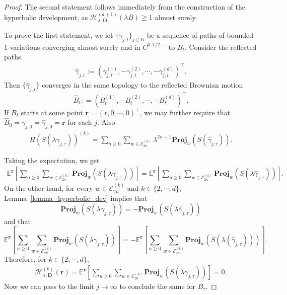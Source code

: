 \documentclass[11pt,a4paper,english,reqno]{amsart}
\theoremstyle{plain}
\newcommand{\1}{\mathbbm{1}}
\newcommand{\proj}{\mathbf{Proj}}
\begin{document}
\begin{proof}
The second statement follows immediately from the construction of the hyperbolic development, as $\mathcal{H}_{\lambda, \mathbf{D}}^{(d+1)}(\lambda B) \geq 1$ almost surely. 

To prove the first statement, we let $\{\gamma_{j,t}\}_{j \in \mathbb{N}}$ be a sequence of paths of bounded $1$-variations converging almost surely and in $C^{0,1/2-}$ to $B_t$. Consider the reflected paths
\begin{align*}
    \hat{\gamma}_{j,t} := \left(  \gamma^{(1)}_{j,t}, -\gamma^{(2)}_{j,t}, \cdots,-\gamma^{(d)}_{j,t} \right)^\top.
\end{align*}
Then $\{\hat{\gamma}_{j,t}\}$ converges in the same topology to the reflected Brownian motion 
\begin{equation}\label{reflected BM}
\hat{B}_t: = \left(B^{(1)}_{t}, - B^{(2)}_t, \cdots, -B^{(d)}_t\right)^\top.
\end{equation}
If $B_t$ starts at some point $\mathbf{r} = (r, 0, \cdots, 0)^\top$, we may further require that $\hat{B}_{0} = \gamma_{j,0} = \hat{\gamma}_{j,0}= \mathbf{r}$ for each $j$. Also
\begin{eqnarray*}
H\left(S\left(\lambda \gamma_ {j,\tau}\right)\right)^{(k)} = \sum_{n \geq 0} \sum_{ w \in \mathcal{E}_{2n}^{(k)}} \lambda^{2n+1} \proj_{w}\left(S( \hat{\gamma}_{j,\tau})\right).
\end{eqnarray*}


Taking the expectation, we get
\begin{eqnarray*}
\mathbb{E}^{\mathbf{r}}\left[ \sum_{n \geq 0} \sum_{ w \in \mathcal{E}_{2n}^{(k)}} \proj_{w}(S(\lambda \gamma_{j,\tau}))\right] = \mathbb{E}^{\mathbf{r}}\left[ \sum_{n \geq 0} \sum_{ w \in \mathcal{E}_{2n}^{(k)}} \proj_{w}\left(S(\lambda \hat{\gamma}_{j,\tau})\right)\right] .
\end{eqnarray*}
On the other hand, for every $w \in \mathcal{E}_{2n}^{(k)}$ and $k \in \{2, \cdots, d\}$,  Lemma~\ref{lemma_hyperbolic_dev} implies that
\begin{equation*}
    \proj_{w}(S(\lambda \gamma_{j,\tau})) = -\proj_{w}\left(S(\lambda \hat{\gamma}_{j,\tau})\right)
\end{equation*}
and that
\begin{equation*}
    \mathbb{E}^{\mathbf{r}}\left[ \sum_{n \geq 0} \sum_{ w \in \mathcal{E}_{2n}^{(k)}} \proj_{w}(S(\lambda \gamma_{j,\tau}))\right] = -\mathbb{E}^{\mathbf{r}}\left[ \sum_{n \geq 0} \sum_{ w \in \mathcal{E}_{2n}^{(k)}} \proj_{w}(S(\lambda (\hat{\gamma}_{j,\tau})))\right].
\end{equation*}
Therefore, for $k \in \{2, \cdots, d\}$,
\begin{eqnarray*}
\mathcal{H}^{(k)}_{\lambda, \mathbf{D}}(\mathbf{r})=\mathbb{E}^{\mathbf{r}}\left[ \sum_{n \geq 0} \sum_{ w \in \mathcal{E}_{2n}^{(k)}} \proj_{w}(S(\lambda \gamma_{j,\tau}))\right] = 0.
\end{eqnarray*} 
Now we can pass to the limit $j\to\infty$ to conclude the same for $B_\tau$.  \end{proof}
\end{document}
